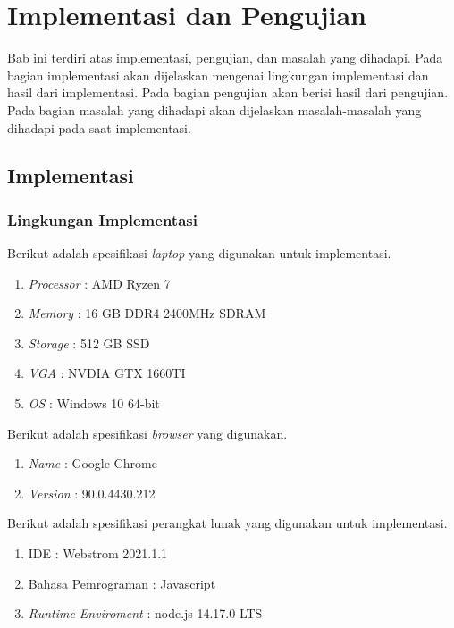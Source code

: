 \chapter{Implementasi dan Pengujian}
\label{chap:implementasi_dan_pengujian}

Bab ini terdiri atas implementasi, pengujian, dan masalah yang dihadapi. Pada bagian implementasi akan dijelaskan mengenai lingkungan implementasi dan hasil dari implementasi. Pada bagian pengujian akan berisi hasil dari pengujian. Pada bagian masalah yang dihadapi akan dijelaskan masalah-masalah yang dihadapi pada saat implementasi.


\section{Implementasi}
\label{sec:implementasi}

\subsection{Lingkungan Implementasi}
\label{sec:lingkungan_implementasi_dan_pengujian}

Berikut adalah spesifikasi \textit{laptop} yang digunakan untuk implementasi.
\begin{enumerate}
    \item \textit{Processor} : AMD Ryzen 7 
    \item \textit{Memory} : 16 GB DDR4 2400MHz SDRAM
    \item \textit{Storage} :  512 GB SSD
    \item \textit{VGA} : NVDIA GTX 1660TI
    \item \textit{OS} : Windows 10 64-bit\\
\end{enumerate}

Berikut adalah spesifikasi \textit{browser} yang digunakan.
\begin{enumerate}
    \item \textit{Name} : Google Chrome  
    \item \textit{Version} : 90.0.4430.212 \\
\end{enumerate}

Berikut adalah spesifikasi perangkat lunak yang digunakan untuk implementasi.
\begin{enumerate}
    \item IDE : Webstrom 2021.1.1
    \item Bahasa Pemrograman : Javascript
    \item \textit{Runtime Enviroment} : node.js 14.17.0 LTS
\end{enumerate}

